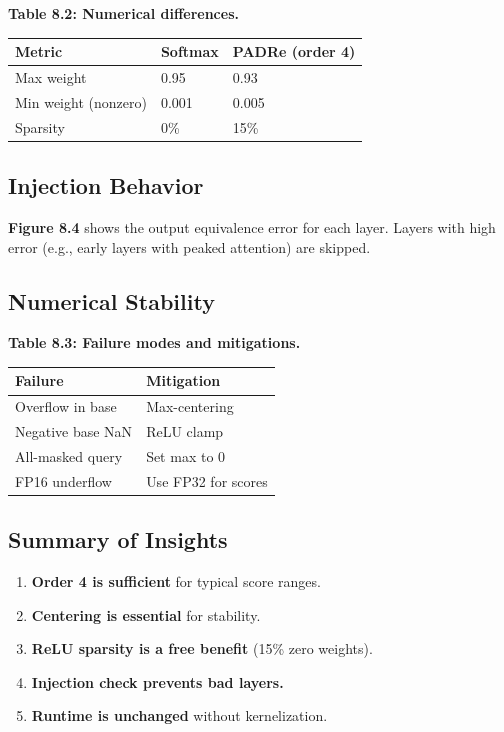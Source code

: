 \textbf{Table 8.2: Numerical differences.}

\begin{table}[H]
\centering
\small
\begin{tabular}{lll}
\toprule
\textbf{Metric} & \textbf{Softmax} & \textbf{PADRe (order 4)} \\
\midrule
Max weight & 0.95 & 0.93 \\
Min weight (nonzero) & 0.001 & 0.005 \\
Sparsity & 0\% & 15\% \\
\bottomrule
\end{tabular}
\end{table}

\subsection{Injection Behavior}

\textbf{Figure 8.4} shows the output equivalence error for each layer. Layers 
with high error (e.g., early layers with peaked attention) are skipped.

\subsection{Numerical Stability}

\textbf{Table 8.3: Failure modes and mitigations.}

\begin{table}[H]
\centering
\small
\begin{tabular}{ll}
\toprule
\textbf{Failure} & \textbf{Mitigation} \\
\midrule
Overflow in base & Max-centering \\
Negative base NaN & ReLU clamp \\
All-masked query & Set max to 0 \\
FP16 underflow & Use FP32 for scores \\
\bottomrule
\end{tabular}
\end{table}

\subsection{Summary of Insights}

\begin{enumerate}
\item \textbf{Order 4 is sufficient} for typical score ranges.
\item \textbf{Centering is essential} for stability.
\item \textbf{ReLU sparsity is a free benefit} (15\% zero weights).
\item \textbf{Injection check prevents bad layers.}
\item \textbf{Runtime is unchanged} without kernelization.

\end{enumerate}


